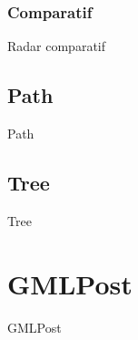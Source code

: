 \documentclass{beamer}
\begin{document}
\subsubsection{Comparatif}
\begin{frame}{Radar comparatif}
\end{frame}


\subsection{Path}
\begin{frame}{Path}
\end{frame}


\subsection{Tree}
\begin{frame}{Tree}
\end{frame}



\section{GMLPost}
\begin{frame}{GMLPost}
\end{frame}

  
\end{document}
